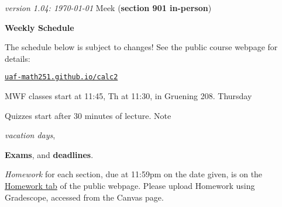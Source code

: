 \documentclass[12pt]{article}
\newcommand{\vacinline}[1]{{\color{OliveGreen} \textsl{#1}}}
\newcommand{\vac}[1]{\strut {\small {\vacinline{#1}}}}
\newcommand{\due}[1]{\strut {\color{BrickRed} \textsl{#1}}}
\newcommand{\dl}[1]{{\small \color{Purple} \textbf{#1}}}
\newcommand{\ee}[1]{\strut {\color{Blue} \textbf{#1}}}
\newcommand{\qq}[1]{\strut {\color{RedOrange} #1}}
\begin{document}
\noindent\footnotesize \emph{version 1.04: \today} \normalsize \hfill Meek (\textbf{section 901 in-person})

\medskip
\centerline{\large \textbf{Weekly Schedule}}

\medskip
The schedule below is subject to changes!  See the public course webpage for details:

\medskip

\centerline{\href{https://uaf-math251.github.io/calc2/}{\texttt{uaf-math251.github.io/calc2}}}

\noindent MWF classes start at 11:45, Th at 11:30, in Gruening 208.  Thursday \qq{Quizzes} start after 30 minutes of lecture.  Note \vac{vacation days}, \ee{Exams}, and \dl{deadlines}.  \due{Homework} for each section, due at 11:59pm on the date given, is on the \href{https://uaf-math251.github.io/calc2/}{Homework tab} of the public webpage.  Please upload Homework using Gradescope, accessed from the Canvas page.

\medskip
\end{document}
